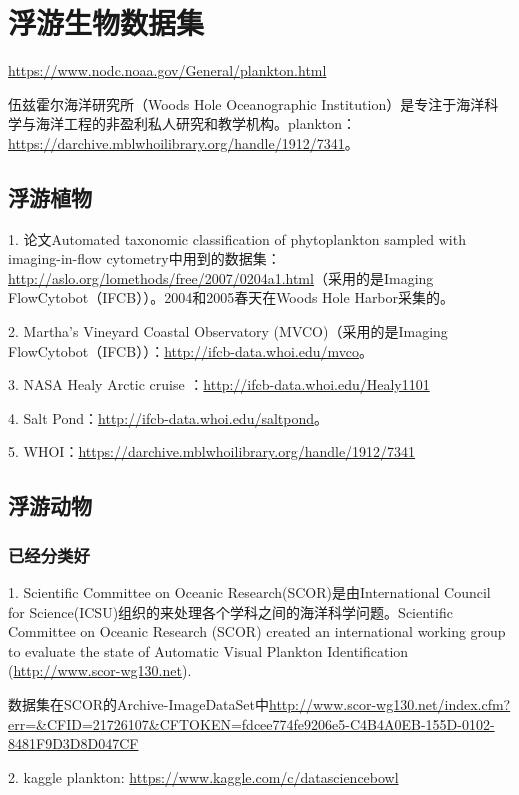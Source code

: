 \section{浮游生物数据集}
\url{https://www.nodc.noaa.gov/General/plankton.html}

伍兹霍尔海洋研究所（Woods Hole Oceanographic Institution）是专注于海洋科学与海洋工程的非盈利私人研究和教学机构。plankton：\url{https://darchive.mblwhoilibrary.org/handle/1912/7341}。

\subsection{浮游植物}

1. 论文Automated taxonomic classification of phytoplankton sampled with imaging-in-flow cytometry中用到的数据集：\url{http://aslo.org/lomethods/free/2007/0204a1.html}（采用的是Imaging FlowCytobot（IFCB））。2004和2005春天在Woods Hole Harbor采集的。

2. Martha’s Vineyard Coastal Observatory (MVCO)（采用的是Imaging FlowCytobot（IFCB））：\url{http://ifcb-data.whoi.edu/mvco}。

3. NASA Healy Arctic cruise ：\url{http://ifcb-data.whoi.edu/Healy1101}

4. Salt Pond：\url{http://ifcb-data.whoi.edu/saltpond}。

5. WHOI：\url{https://darchive.mblwhoilibrary.org/handle/1912/7341}


\subsection{浮游动物}

\subsubsection{已经分类好}
1. Scientific Committee on Oceanic Research(SCOR)是由International Council for Science(ICSU)组织的来处理各个学科之间的海洋科学问题。Scientific Committee on Oceanic Research (SCOR) created an international working group to evaluate the state of Automatic Visual Plankton Identification (\url{http://www.scor-wg130.net})\cite{gorsky2010digital}.

数据集在SCOR的Archive-ImageDataSet中\url{http://www.scor-wg130.net/index.cfm?err=&CFID=21726107&CFTOKEN=fdcee774fe9206e5-C4B4A0EB-155D-0102-8481F9D3D8D047CF}

2. kaggle plankton: \url{https://www.kaggle.com/c/datasciencebowl}

